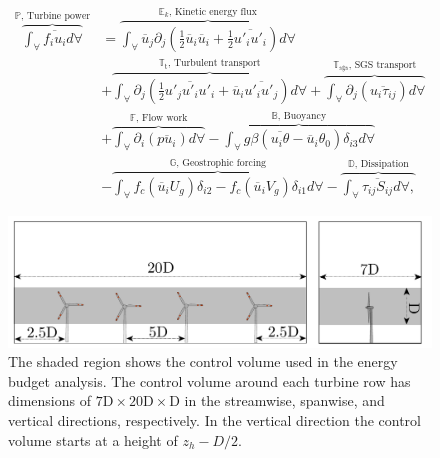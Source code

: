 \documentclass[%
 aip,
 amsmath,amssymb,
reprint,
twocolumn,%
author-numerical,%
]{revtex4-1}
\begin{document}
{{\begin{equation}
\begin{split}
 \overbrace{\int^{}_{\forall}\overline{f_iu_i}d\forall}^{\text{$\mathbb{P}$, Turbine power}}&=\overbrace{\int^{}_{\forall}\overline{u}_j\partial_j\left({\frac{1}{2}\overline{u}_i\overline{u}_i}+\frac{1}{2}\overline{u'_iu'_i}\right)d\forall}^\text{$\mathbb{E}_k$, Kinetic energy flux}\\&+\overbrace{\int^{}_{\forall}\partial_j\left(\frac{1}{2}{\overline{u'_ju'_iu'_i}}+\overline{u}_i\overline{u'_iu'_j}\right)d\forall}^\text{$\mathbb{T}_\text{t}$, Turbulent transport}+\overbrace{\int^{}_{\forall}\partial_j\left( \overline{u_i\tau_{ij}}\right)d\forall}^{\text{$\mathbb{T_\text{sgs}}$, SGS transport}}\\&+\overbrace{\int^{}_{\forall}\partial_i{\left(\overline{pu_i}\right)}d\forall}^{\text{$\mathbb{F}$, Flow work}}-\overbrace{\int^{}_{\forall}g\beta(\overline{u_i\theta}-\overline{u}_i\theta_0)\delta_{i3}d\forall}^{\text{$\mathbb{B}$, Buoyancy}}\\&-\overbrace{\int^{}_{\forall}f_c\left(\overline{u}_iU_g\right)\delta_{i2}-f_c\left(\overline{u}_iV_g\right)\delta_{i1}d\forall}^{\text{$\mathbb{G}$, Geostrophic 
 forcing}}-\overbrace{\int^{}_{\forall}\overline{\tau_{ij}S_{ij}}d\forall,}^{\text{$\mathbb{D}$, Dissipation}}
\end{split}\label{eqn9}
\end{equation}

\begin{figure}[ht!]
	\centering
	\includegraphics[width=0.75\linewidth]{fig6}
	\vspace{-0.25cm}
	\caption{The shaded region shows the control volume used in the energy budget analysis. The control volume around each turbine row has dimensions of $7\text{D}\times{20\text{D}}\times{\text{D}}$ in the streamwise, spanwise, and vertical directions, respectively. In the vertical direction the control volume starts at a height of $z_h-D/2$.}
	\label{cv}
\end{figure}

}}
\end{document}
